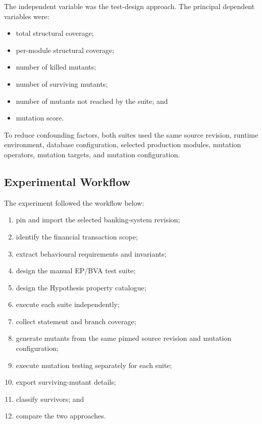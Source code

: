 \documentclass[12pt]{article}
\begin{document}
The independent variable was the test-design approach. The principal dependent
variables were:

\begin{itemize}
    \item total structural coverage;
    \item per-module structural coverage;
    \item number of killed mutants;
    \item number of surviving mutants;
    \item number of mutants not reached by the suite; and
    \item mutation score.
\end{itemize}

To reduce confounding factors, both suites used the same source revision,
runtime environment, database configuration, selected production modules,
mutation operators, mutation targets, and mutation configuration.

\subsection{Experimental Workflow}

The experiment followed the workflow below:

\begin{enumerate}
    \item pin and import the selected banking-system revision;
    \item identify the financial transaction scope;
    \item extract behavioural requirements and invariants;
    \item design the manual EP/BVA test suite;
    \item design the Hypothesis property catalogue;
    \item execute each suite independently;
    \item collect statement and branch coverage;
    \item generate mutants from the same pinned source revision and mutation
      configuration;
    \item execute mutation testing separately for each suite;
    \item export surviving-mutant details;
    \item classify survivors; and
    \item compare the two approaches.
\end{enumerate}
\end{document}
